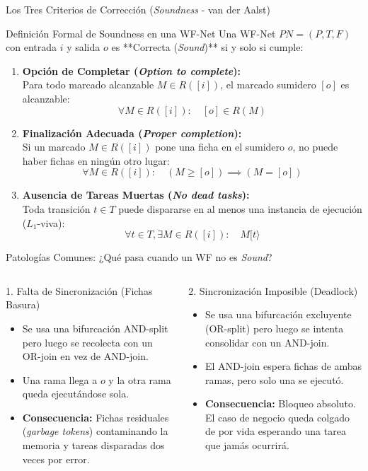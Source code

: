 \documentclass[10pt, aspectratio=169]{beamer}
\begin{document}
\begin{frame}{Los Tres Criterios de Corrección (\emph{Soundness} - van der Aalst)}
	\begin{block}{Definición Formal de Soundness en una WF-Net}
		Una WF-Net $PN = (P, T, F)$ con entrada $i$ y salida $o$ es **Correcta (\emph{Sound})** si y solo si cumple:
		\begin{enumerate}
			\item \textbf{Opción de Completar (\emph{Option to complete}):}\\
			Para todo marcado alcanzable $M \in R([i])$, el marcado sumidero $[o]$ es alcanzable:
			\[ \forall M \in R([i]): \quad [o] \in R(M) \]
			\item \textbf{Finalización Adecuada (\emph{Proper completion}):}\\
			Si un marcado $M \in R([i])$ pone una ficha en el sumidero $o$, no puede haber fichas en ningún otro lugar:
			\[ \forall M \in R([i]): \quad (M \ge [o]) \implies (M = [o]) \]
			\item \textbf{Ausencia de Tareas Muertas (\emph{No dead tasks}):}\\
			Toda transición $t \in T$ puede dispararse en al menos una instancia de ejecución ($L_1$-viva):
			\[ \forall t \in T, \exists M \in R([i]): \quad M[t\rangle \]
		\end{enumerate}
	\end{block}
\end{frame}

\begin{frame}{Patologías Comunes: ¿Qué pasa cuando un WF no es \emph{Sound}?}
	\begin{columns}
		\begin{alertblock}{1. Falta de Sincronización (Fichas Basura)}
			\begin{itemize}
				\item Se usa una bifurcación AND-split pero luego se recolecta con un OR-join en vez de AND-join.
				\item Una rama llega a $o$ y la otra rama queda ejecutándose sola.
				\item \textbf{Consecuencia:} Fichas residuales (\emph{garbage tokens}) contaminando la memoria y tareas disparadas dos veces por error.
			\end{itemize}
		\end{alertblock}

		\begin{alertblock}{2. Sincronización Imposible (Deadlock)}
			\begin{itemize}
				\item Se usa una bifurcación excluyente (OR-split) pero luego se intenta consolidar con un AND-join.
				\item El AND-join espera fichas de ambas ramas, pero solo una se ejecutó.
				\item \textbf{Consecuencia:} Bloqueo absoluto. El caso de negocio queda colgado de por vida esperando una tarea que jamás ocurrirá.
			\end{itemize}
		\end{alertblock}
	\end{columns}
\end{frame}
\end{document}
